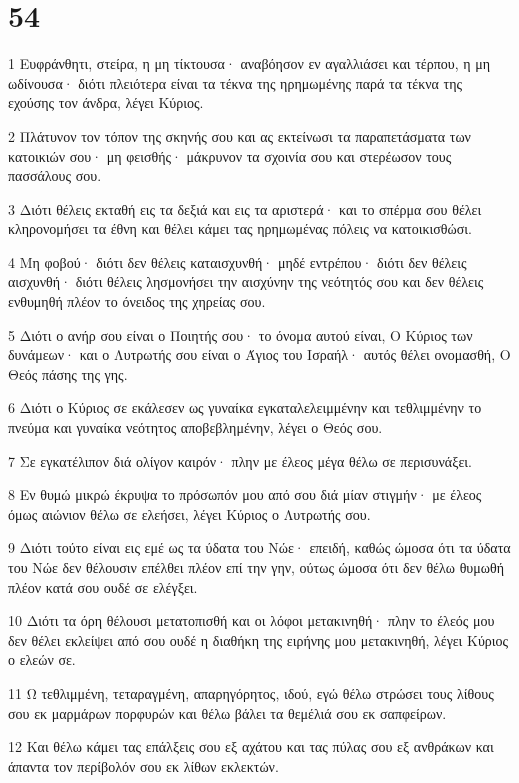 \chapter{54}

\par 1 Ευφράνθητι, στείρα, η μη τίκτουσα· αναβόησον εν αγαλλιάσει και τέρπου, η μη ωδίνουσα· διότι πλειότερα είναι τα τέκνα της ηρημωμένης παρά τα τέκνα της εχούσης τον άνδρα, λέγει Κύριος.
\par 2 Πλάτυνον τον τόπον της σκηνής σου και ας εκτείνωσι τα παραπετάσματα των κατοικιών σου· μη φεισθής· μάκρυνον τα σχοινία σου και στερέωσον τους πασσάλους σου.
\par 3 Διότι θέλεις εκταθή εις τα δεξιά και εις τα αριστερά· και το σπέρμα σου θέλει κληρονομήσει τα έθνη και θέλει κάμει τας ηρημωμένας πόλεις να κατοικισθώσι.
\par 4 Μη φοβού· διότι δεν θέλεις καταισχυνθή· μηδέ εντρέπου· διότι δεν θέλεις αισχυνθή· διότι θέλεις λησμονήσει την αισχύνην της νεότητός σου και δεν θέλεις ενθυμηθή πλέον το όνειδος της χηρείας σου.
\par 5 Διότι ο ανήρ σου είναι ο Ποιητής σου· το όνομα αυτού είναι, Ο Κύριος των δυνάμεων· και ο Λυτρωτής σου είναι ο Άγιος του Ισραήλ· αυτός θέλει ονομασθή, Ο Θεός πάσης της γης.
\par 6 Διότι ο Κύριος σε εκάλεσεν ως γυναίκα εγκαταλελειμμένην και τεθλιμμένην το πνεύμα και γυναίκα νεότητος αποβεβλημένην, λέγει ο Θεός σου.
\par 7 Σε εγκατέλιπον διά ολίγον καιρόν· πλην με έλεος μέγα θέλω σε περισυνάξει.
\par 8 Εν θυμώ μικρώ έκρυψα το πρόσωπόν μου από σου διά μίαν στιγμήν· με έλεος όμως αιώνιον θέλω σε ελεήσει, λέγει Κύριος ο Λυτρωτής σου.
\par 9 Διότι τούτο είναι εις εμέ ως τα ύδατα του Νώε· επειδή, καθώς ώμοσα ότι τα ύδατα του Νώε δεν θέλουσιν επέλθει πλέον επί την γην, ούτως ώμοσα ότι δεν θέλω θυμωθή πλέον κατά σου ουδέ σε ελέγξει.
\par 10 Διότι τα όρη θέλουσι μετατοπισθή και οι λόφοι μετακινηθή· πλην το έλεός μου δεν θέλει εκλείψει από σου ουδέ η διαθήκη της ειρήνης μου μετακινηθή, λέγει Κύριος ο ελεών σε.
\par 11 Ω τεθλιμμένη, τεταραγμένη, απαρηγόρητος, ιδού, εγώ θέλω στρώσει τους λίθους σου εκ μαρμάρων πορφυρών και θέλω βάλει τα θεμέλιά σου εκ σαπφείρων.
\par 12 Και θέλω κάμει τας επάλξεις σου εξ αχάτου και τας πύλας σου εξ ανθράκων και άπαντα τον περίβολόν σου εκ λίθων εκλεκτών.
